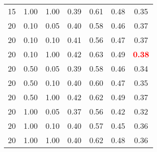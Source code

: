 \begin{tabular}{lllcccc}
15 & 1.00 & 1.00 & 0.39 & 0.61 & 0.48 & 0.35 \\ 
20 & 0.10 & 0.05 & 0.40 & 0.58 & 0.46 & 0.37 \\ 
20 & 0.10 & 0.10 & 0.41 & 0.56 & 0.47 & 0.37 \\ 
20 & 0.10 & 1.00 & 0.42 & 0.63 & 0.49 & \textbf{\textcolor{red}{0.38}} \\ 
20 & 0.50 & 0.05 & 0.39 & 0.58 & 0.46 & 0.34 \\ 
20 & 0.50 & 0.10 & 0.40 & 0.60 & 0.47 & 0.35 \\ 
20 & 0.50 & 1.00 & 0.42 & 0.62 & 0.49 & 0.37 \\ 
20 & 1.00 & 0.05 & 0.37 & 0.56 & 0.42 & 0.32 \\ 
20 & 1.00 & 0.10 & 0.40 & 0.57 & 0.45 & 0.36 \\ 
20 & 1.00 & 1.00 & 0.40 & 0.62 & 0.48 & 0.36 \\ 
\end{tabular} 
